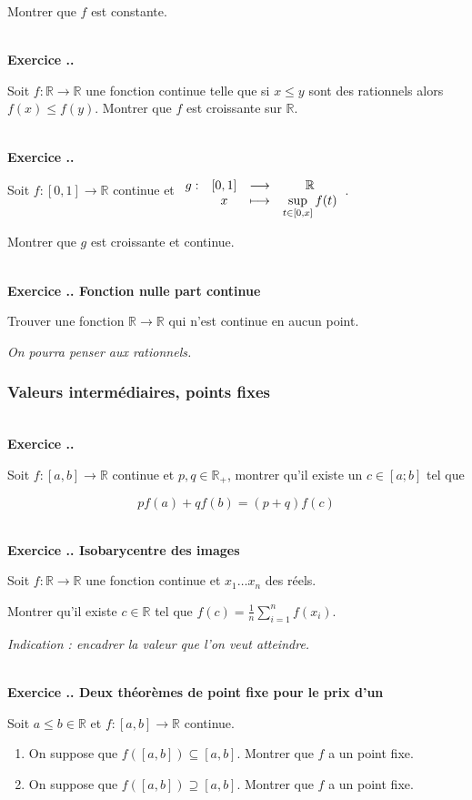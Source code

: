 \documentclass{article}
\newcommand{\fonction}[5]{\raisebox{-0.5\baselineskip}{$\begin{array}{lccc}
    #1: & #2 & \longrightarrow & #3 \\
        & #4 & \longmapsto & #5 \end{array}$}}
\newcommand{\mb}[1]{\mathbb{#1}}
\newcounter{exo}
\newcommand{\exercice}[1][\null]{\textbf{\\ Exercice \thesection.\theexo. #1} \addtocounter{exo}{1}}
\begin{document}
Montrer que $f$ est constante.

\exercice

Soit $f : \mb{R} \rightarrow \mb{R}$ une fonction continue telle que si $ x \le y$ sont des rationnels alors $f(x) \le f(y)$. Montrer que $f$ est croissante sur $\mb{R}$.


\exercice

Soit $f : [0,1] \rightarrow \mb{R}$ continue et $\fonction{g}{[0,1]}{\mb{R}}{x}{\displaystyle \sup_{t \in [0,x]} f(t)}$.

Montrer que $g$ est croissante et continue.

\exercice[Fonction nulle part continue]

Trouver une fonction $\mb{R} \rightarrow \mb{R}$ qui n'est continue en aucun point.

\emph{On pourra penser aux rationnels.}




\subsubsection{Valeurs intermédiaires, points fixes}

\exercice

Soit $f : [a,b] \to \mb{R}$ continue et $p,q \in \mb{R}_+$, montrer 
qu'il existe un $c \in [a;b]$ tel que 

\begin{equation*}
    p f(a) + q f(b) = (p + q) f (c)
\end{equation*}


\exercice[Isobarycentre des images]

Soit $f : \mb{R} \rightarrow \mb{R}$ une fonction continue et $x_1 \dots x_n$ des réels.

Montrer qu'il existe $c \in \mb{R}$ tel que $\displaystyle f(c) = \frac{1}{n} \sum_{i=1}^n f(x_i)$.

\emph{Indication : encadrer la valeur que l'on veut atteindre.}


\exercice[Deux théorèmes de point fixe pour le prix d'un]

Soit $a\le b \in \mb{R}$ et $f : [a,b] \rightarrow \mb{R}$ continue.

\begin{enumerate}

\item On suppose que $f([a,b]) \subseteq [a,b]$. Montrer que $f$ a un point fixe.

\item On suppose que $f([a,b]) \supseteq [a,b]$. Montrer que $f$ a un point fixe.

\end{enumerate}
\end{document}
